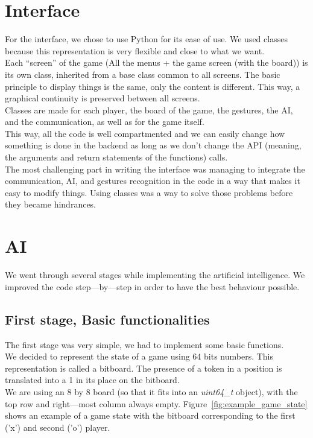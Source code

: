 \documentclass[11pt, a4paper, oneside]{report}
\begin{document}
	\section{Interface}
	For the interface, we chose to use Python for its ease of use. We used classes because this representation is very flexible and close to what we want. \\

	Each “screen” of the game (All the menus + the game screen (with the board)) is its own class, inherited from a base class common to all screens. The basic principle to display things is the same, only the content is different. This way, a graphical continuity is preserved between all screens. \\

	Classes are made for each player, the board of the game, the gestures, the AI, and the communication, as well as for the game itself. \\
	This way, all the code is well compartmented and we can easily change how something is done in the backend as long as we don't change the API (meaning, the arguments and return statements of the functions) calls. \\

	The most challenging part in writing the interface was managing to integrate the communication, AI, and gestures recognition in the code in a way that makes it easy to modify things. Using classes was a way to solve those problems before they became hindrances.

	\section{AI}\label{AI_section}

	We went through several stages while implementing the artificial intelligence. We improved the code step—by—step in order to have the best behaviour possible. \\

	\subsection{First stage, Basic functionalities}

	The first stage was very simple, we had to implement some basic functions. \\
	We decided to represent the state of a game using 64 bits numbers. This representation is called a bitboard. The presence of a token in a position is translated into a 1 in its place on the bitboard. \\
	We are using an 8 by 8 board (so that it fits into an \textit{uint64\_t} object), with the top row and right—most column always empty. Figure~\ref{fig:example_game_state} shows an example of a game state with the bitboard corresponding to the first ('x') and second ('o') player.
\end{document}

